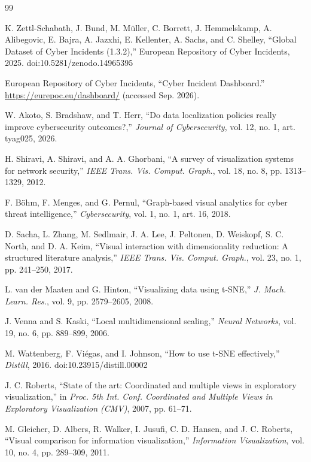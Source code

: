 \documentclass[conference]{IEEEtran}
\begin{document}
\begin{thebibliography}{99}

K. Zettl-Schabath, J. Bund, M. Müller, C. Borrett, J. Hemmelskamp, A. Alibegovic,
E. Bajra, A. Jazxhi, E. Kellenter, A. Sachs, and C. Shelley,
``Global Dataset of Cyber Incidents (1.3.2),'' European Repository of Cyber Incidents,
2025. doi:10.5281/zenodo.14965395

European Repository of Cyber Incidents, ``Cyber Incident Dashboard.''
\url{https://eurepoc.eu/dashboard/} (accessed Sep. 2026).

W. Akoto, S. Bradshaw, and T. Herr, ``Do data localization policies really improve
cybersecurity outcomes?,'' \emph{Journal of Cybersecurity}, vol. 12, no. 1,
art. tyag025, 2026.

H. Shiravi, A. Shiravi, and A. A. Ghorbani, ``A survey of visualization systems for
network security,'' \emph{IEEE Trans. Vis. Comput. Graph.}, vol. 18, no. 8,
pp. 1313--1329, 2012.

F. Böhm, F. Menges, and G. Pernul, ``Graph-based visual analytics for cyber threat
intelligence,'' \emph{Cybersecurity}, vol. 1, no. 1, art. 16, 2018.

D. Sacha, L. Zhang, M. Sedlmair, J. A. Lee, J. Peltonen, D. Weiskopf, S. C. North, and
D. A. Keim, ``Visual interaction with dimensionality reduction: A structured literature
analysis,'' \emph{IEEE Trans. Vis. Comput. Graph.}, vol. 23, no. 1, pp. 241--250, 2017.

L. van der Maaten and G. Hinton, ``Visualizing data using t-SNE,'' \emph{J. Mach. Learn. Res.}, vol. 9, pp. 2579--2605, 2008.

J. Venna and S. Kaski, ``Local multidimensional scaling,'' \emph{Neural Networks}, vol. 19, no. 6, pp. 889--899, 2006.

M. Wattenberg, F. Viégas, and I. Johnson, ``How to use t-SNE effectively,''
\emph{Distill}, 2016. doi:10.23915/distill.00002

J. C. Roberts, ``State of the art: Coordinated and multiple views in exploratory
visualization,'' in \emph{Proc. 5th Int. Conf. Coordinated and Multiple Views in
Exploratory Visualization (CMV)}, 2007, pp. 61--71.

M. Gleicher, D. Albers, R. Walker, I. Jusufi, C. D. Hansen, and J. C. Roberts, ``Visual comparison for information visualization,'' \emph{Information Visualization}, vol. 10, no. 4, pp. 289--309, 2011.

\end{thebibliography}
\end{document}

